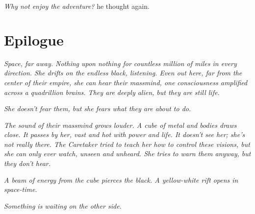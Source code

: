 \documentclass[twoside,letterpaper,12pt]{memoir}
\begin{document}
\textit{Why not enjoy the adventure? }he thought again. 

\chapter*{Epilogue}

\textit{Space, far away. Nothing upon nothing for countless million of miles in every direction. She drifts on the endless black, listening. Even out here, far from the center of their empire, she can hear their massmind, one consciousness amplified across a quadrillion brains. They are deeply alien, but they are still life.} 

\textit{She doesn’t fear them, but she fears what they are about to do.} 

\textit{The sound of their massmind grows louder. A cube of metal and bodies draws close. It passes by her, vast and hot with power and life. It doesn’t see her; she’s not really there. The Caretaker tried to teach her how to control these visions, but she can only ever watch, unseen and unheard. She tries to warn them anyway, but they don't hear.} 

\textit{A beam of energy from the cube pierces the black. A yellow-white rift opens in space-time.} 

\textit{Something is waiting on the other side.}
\end{document}
